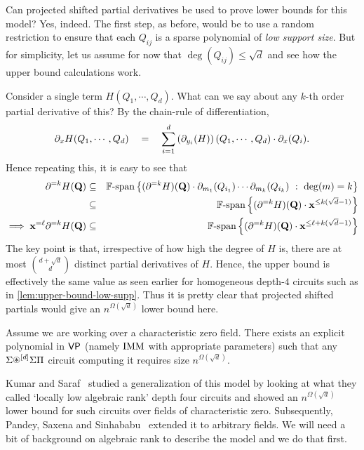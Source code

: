 Can projected shifted partial derivatives be used to prove lower bounds for this model? Yes, indeed. The first step, as before, would be to use a random restriction to ensure that each $Q_{ij}$ is a sparse polynomial of \emph{low support size}. But for simplicity, let us assume for now that $\deg(Q_{ij})\leq \sqrt{d}$ and see how the upper bound calculations work. 

Consider a single term $H(Q_1,\cdots, Q_d)$. What can we say about any $k$-th order partial derivative of this? By the chain-rule of differentiation,
\[
\partial_{x} H(Q_1,\cdots, Q_d) \quad = \quad  \sum_{i=1}^d \left(\partial_{y_i}(H)\right)(Q_1,\cdots, Q_d) \cdot \partial_x(Q_i). 
\]
Hence repeating this, it is easy to see that 
\begin{eqnarray*}
\partial^{=k} H(\mathbf{Q}) &\subseteq& \operatorname{\mathbb{F}\text{-span}} \left\{{(\partial^{=k}H)(\mathbf{Q}) \cdot \partial_{m_1}(Q_{i_1}) \cdots \partial_{m_k}(Q_{i_k})}\ : \ {\deg(m) = k}\right\}\\
& \subseteq & \operatorname{\mathbb{F}\text{-span}}\left\{(\partial^{=k}H)(\mathbf{Q}) \cdot \mathbf{x}^{\leq k(\sqrt{d}-1)}\right\}\\
\implies \mathbf{x}^{=\ell}\partial^{=k} H(\mathbf{Q}) & \subseteq & \operatorname{\mathbb{F}\text{-span}}\left\{(\partial^{=k}H)(\mathbf{Q}) \cdot \mathbf{x}^{\leq \ell + k(\sqrt{d}-1)}\right\}
\end{eqnarray*}
The key point is that, irrespective of how high the degree of $H$ is, there are at most $\binom{d+\sqrt{d}}{d}$ distinct partial derivatives of $H$.
Hence, the upper bound is effectively the same value as seen earlier for homogeneous depth-$4$ circuits such as in \autoref{lem:upper-bound-low-supp}.
Thus it is pretty clear that projected shifted partials would give an $n^{\Omega(\sqrt{d})}$ lower bound here. 

\begin{observation}
Assume we are working over a characteristic zero field. There exists an explicit polynomial in $\mathsf{VP}$ (namely $\operatorname{\mathrm{IMM}}$ with appropriate parameters) such that any $\Sigma\circast^{[d]}\Sigma\Pi$ circuit computing it requires size $n^{\Omega(\sqrt{d})}$. 
\end{observation}

Kumar and Saraf~\cite{KS16lowrank} studied a generalization of this model by looking at what they called `locally low algebraic rank' depth four circuits and showed an $n^{\Omega(\sqrt{d})}$ lower bound for such circuits over fields of characteristic zero. Subsequently, Pandey, Saxena and Sinhababu~\cite{PSS16} extended it to arbitrary fields. We will need a bit of background on algebraic rank to describe the model and we do that first. 

